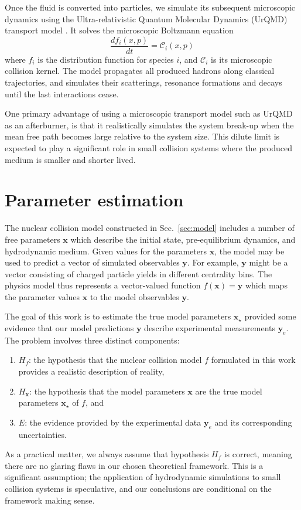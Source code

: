 \documentclass[aps,prc,reprint,amsmath,nofootinbib]{revtex4-1}
\newcommand{\xv}{\mathbf x}
\newcommand{\yv}{\mathbf y}
\begin{document}
Once the fluid is converted into particles, we simulate its subsequent microscopic dynamics using the Ultra-relativistic Quantum Molecular Dynamics (UrQMD) transport model \cite{Bass:1998ca, Bleicher:1999xi}.
It solves the microscopic Boltzmann equation
\begin{equation}
  \frac{df_i(x, p)}{dt} = \mathcal{C}_i(x, p)
\end{equation}
where $f_i$ is the distribution function for species $i$, and $\mathcal{C}_i$ is its microscopic collision kernel.
The model propagates all produced hadrons along classical trajectories, and simulates their scatterings, resonance formations and decays until the last interactions cease.

One primary advantage of using a microscopic transport model such as UrQMD as an afterburner, is that it realistically simulates the system break-up when the mean free path becomes large relative to the system size.
This dilute limit is expected to play a significant role in small collision systems where the produced medium is smaller and shorter lived.


\section{Parameter estimation}
\label{sec:calibration}

The nuclear collision model constructed in Sec.~\ref{sec:model} includes a number of free parameters $\xv$ which describe the initial state, pre-equilibrium dynamics, and hydrodynamic medium.
Given values for the parameters $\xv$, the model may be used to predict a vector of simulated observables $\yv$.
For example, $\yv$ might be a vector consisting of charged particle yields in different centrality bins.
The physics model thus represents a vector-valued function $f(\xv) = \yv$ which maps the parameter values $\xv$ to the model observables $\yv$.

The goal of this work is to estimate the true model parameters $\xv_\star$ provided some evidence that our model predictions $\yv$ describe experimental measurements $\yv_e$.
The problem involves three distinct components:
\begin{enumerate}[itemsep=0pt, leftmargin=2\parindent]
  \item $H_f$: the hypothesis that the nuclear collision model $f$ formulated in this work provides a realistic description of reality,
  \item $H_\xv$: the hypothesis that the model parameters $\xv$ are the true model parameters $\xv_\star$ of $f$, and
  \item $E$: the evidence provided by the experimental data $\yv_e$ and its corresponding uncertainties.
\end{enumerate}
As a practical matter, we always assume that hypothesis $H_f$ is correct, meaning there are no glaring flaws in our chosen theoretical framework.
This is a significant assumption; the application of hydrodynamic simulations to small collision systems is speculative, and our conclusions are conditional on the framework making sense.
\end{document}
